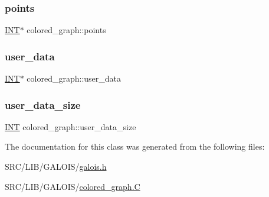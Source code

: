 \subsubsection{\texorpdfstring{points}{points}}
{\footnotesize\ttfamily \mbox{\hyperlink{galois_8h_a09fddde158a3a20bd2dcadb609de11dc}{I\+NT}}$\ast$ colored\+\_\+graph\+::points}

\mbox{\label{classcolored__graph_ae8c2842fc5f7382948ec0cf0afd581e5}} 
\subsubsection{\texorpdfstring{user\+\_\+data}{user\_data}}
{\footnotesize\ttfamily \mbox{\hyperlink{galois_8h_a09fddde158a3a20bd2dcadb609de11dc}{I\+NT}}$\ast$ colored\+\_\+graph\+::user\+\_\+data}

\mbox{\label{classcolored__graph_afc57ecc5e5d94a98904a8c7eb748a73f}} 
\subsubsection{\texorpdfstring{user\+\_\+data\+\_\+size}{user\_data\_size}}
{\footnotesize\ttfamily \mbox{\hyperlink{galois_8h_a09fddde158a3a20bd2dcadb609de11dc}{I\+NT}} colored\+\_\+graph\+::user\+\_\+data\+\_\+size}



The documentation for this class was generated from the following files\+:\begin{DoxyCompactItemize}
\item 
S\+R\+C/\+L\+I\+B/\+G\+A\+L\+O\+I\+S/\mbox{\hyperlink{galois_8h}{galois.\+h}}\item 
S\+R\+C/\+L\+I\+B/\+G\+A\+L\+O\+I\+S/\mbox{\hyperlink{_l_i_b_2_g_a_l_o_i_s_2colored__graph_8_c}{colored\+\_\+graph.\+C}}\end{DoxyCompactItemize}
